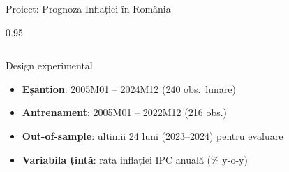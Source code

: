 \documentclass[9pt, aspectratio=169, t]{beamer}
\begin{document}
\begin{frame}{Proiect: Prognoza Inflației în România}
\begin{cminipage}{0.95\textwidth}
{\begin{columns}[T]
            \begin{alertblock}{Design experimental}
                \begin{itemize}\setlength{\itemsep}{0pt}
                    \item \textbf{Eșantion}: 2005M01 -- 2024M12 (240 obs.\ lunare)
                    \item \textbf{Antrenament}: 2005M01 -- 2022M12 (216 obs.)
                    \item \textbf{Out-of-sample}: ultimii 24 luni (2023--2024) pentru evaluare
                    \item \textbf{Variabila țintă}: rata inflației IPC anuală (\% y-o-y)
                \end{itemize}
            \end{alertblock}
        \end{columns}
        }
    \end{cminipage}
\end{frame}
\end{document}
